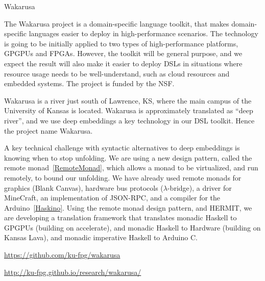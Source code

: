 \begin{hcarentry}[updated]{Wakarusa}
\label{Wakarusa}
\makeheader

The Wakarusa project is a domain-specific language toolkit,
that makes domain-specific languages easier to deploy in
high-performance scenarios. The technology is going to be initially
applied to two types of high-performance platforms, GPGPUs and
FPGAs. However, the toolkit will be general purpose, and we expect the
result will also make it easier to deploy DSLs in situations where
resource usage needs to be well-understand, such as cloud resources
and embedded systems. The project is funded by the NSF.

Wakarusa is a river just south of Lawrence, KS, where the main campus
of the University of Kansas is located. Wakarusa is approximately
translated as ``deep river'', and we use deep embeddings a key
technology in our DSL toolkit. Hence the project name Wakarusa.

A key technical challenge with syntactic alternatives to deep embeddings
is knowing when to stop unfolding. We are using a new design pattern,
called the remote monad~\cref{RemoteMonad},
which allows a monad to be virtualized, and run remotely, to bound our unfolding.
%
We have already used remote monads for graphics (Blank Canvas),
hardware bus protocols ($\lambda$-bridge), a driver for MineCraft,
an implementation of JSON-RPC, and a compiler for the Arduino~\cref{Haskino}.
Using the remote monad design pattern, and HERMIT, we are developing
a translation framework that translates monadic Haskell to GPGPUs (building on
accelerate), and monadic Haskell to Hardware (building on Kansas Lava),
and monadic imperative Haskell to Arduino C.

\FurtherReading
\begin{compactitem}
\item
  \url{https://github.com/ku-fpg/wakarusa}
\item
  \url{http://ku-fpg.github.io/research/wakarusa/}
\end{compactitem}
\end{hcarentry}

